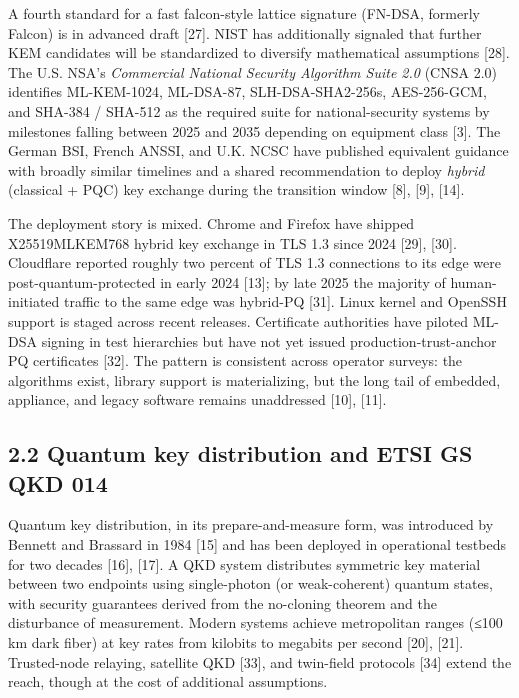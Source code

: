 A fourth standard for a fast falcon-style lattice signature (FN-DSA,
formerly Falcon) is in advanced draft {[}27{]}. NIST has additionally
signaled that further KEM candidates will be standardized to diversify
mathematical assumptions {[}28{]}. The U.S. NSA's \emph{Commercial
National Security Algorithm Suite 2.0} (CNSA 2.0) identifies
ML-KEM-1024, ML-DSA-87, SLH-DSA-SHA2-256s, AES-256-GCM, and SHA-384 /
SHA-512 as the required suite for national-security systems by
milestones falling between 2025 and 2035 depending on equipment class
{[}3{]}. The German BSI, French ANSSI, and U.K. NCSC have published
equivalent guidance with broadly similar timelines and a shared
recommendation to deploy \emph{hybrid} (classical + PQC) key exchange
during the transition window {[}8{]}, {[}9{]}, {[}14{]}.

The deployment story is mixed. Chrome and Firefox have shipped
X25519MLKEM768 hybrid key exchange in TLS 1.3 since 2024 {[}29{]},
{[}30{]}. Cloudflare reported roughly two percent of TLS 1.3 connections
to its edge were post-quantum-protected in early 2024 {[}13{]}; by late
2025 the majority of human-initiated traffic to the same edge was
hybrid-PQ {[}31{]}. Linux kernel and OpenSSH support is staged across
recent releases. Certificate authorities have piloted ML-DSA signing in
test hierarchies but have not yet issued production-trust-anchor PQ
certificates {[}32{]}. The pattern is consistent across operator
surveys: the algorithms exist, library support is materializing, but the
long tail of embedded, appliance, and legacy software remains
unaddressed {[}10{]}, {[}11{]}.

\subsection{2.2 Quantum key distribution and ETSI GS QKD
014}\label{quantum-key-distribution-and-etsi-gs-qkd-014}

Quantum key distribution, in its prepare-and-measure form, was
introduced by Bennett and Brassard in 1984 {[}15{]} and has been
deployed in operational testbeds for two decades {[}16{]}, {[}17{]}. A
QKD system distributes symmetric key material between two endpoints
using single-photon (or weak-coherent) quantum states, with security
guarantees derived from the no-cloning theorem and the disturbance of
measurement. Modern systems achieve metropolitan ranges (≤100 km dark
fiber) at key rates from kilobits to megabits per second {[}20{]},
{[}21{]}. Trusted-node relaying, satellite QKD {[}33{]}, and twin-field
protocols {[}34{]} extend the reach, though at the cost of additional
assumptions.


